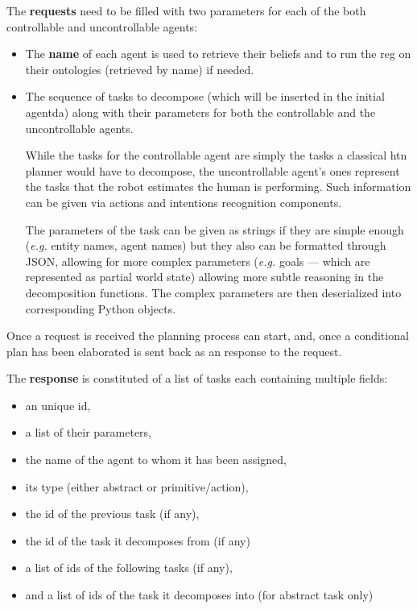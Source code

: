 \documentclass[a4paper,11pt,twoside]{StyleThese}
\begin{document}
The \textbf{requests} need to be filled with two parameters for each of the both controllable and uncontrollable agents:
\begin{itemize}
\item The \textbf{name} of each agent is used to retrieve their beliefs and to run the \acrshort{reg} on their ontologies (retrieved by name) if needed.

\item The sequence of tasks to decompose (which will be inserted in the initial agentda) along with their parameters for both the controllable and the uncontrollable agents. 

While the tasks for the controllable agent are simply the tasks a classical \acrshort{htn} planner would have to decompose, the uncontrollable agent's ones represent the tasks that the robot estimates the human is performing. Such information can be given via actions and intentions recognition components. 

The parameters of the task can be given as strings if they are simple enough (\textit{e.g.} entity names, agent names) but they also can be formatted through JSON, allowing for more complex parameters (\textit{e.g.} goals --- which are represented as partial world state) allowing more subtle reasoning in the decomposition functions. The complex parameters are then deserialized into corresponding Python objects.
\end{itemize}

Once a request is received the planning process can start, and, once a conditional plan has been elaborated is sent back as an response to the request. 

The \textbf{response} is constituted of a list of tasks each containing multiple fields: 
\begin{itemize}
\item an unique id,

\item a list of their parameters,

\item the name of the agent to whom it has been assigned,

\item its type (either abstract or primitive/action),

\item the id of the previous task (if any),

\item the id of the task it decomposes from (if any)

\item a list of ids of the following tasks (if any),

\item and a list of ids of the task it decomposes into (for abstract task only)
\end{itemize}
\end{document}
